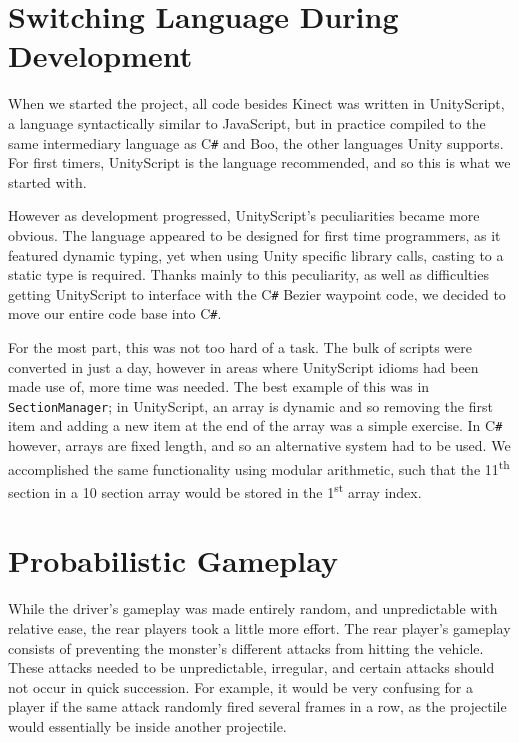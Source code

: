 \documentclass[a4paper,oneside]{memoir}
\begin{document}
		\section{Switching Language During Development}

			When we started the project, all code besides Kinect was written in UnityScript, a language syntactically similar to JavaScript, but in practice compiled to the same intermediary language as C\texttt{\#} and Boo, the other languages Unity supports. 
			For first timers, UnityScript is the language recommended, and so this is what we started with.

			However as development progressed, UnityScript's peculiarities became more obvious.
			The language appeared to be designed for first time programmers, as it featured dynamic typing, yet when using Unity specific library calls, casting to a static type is required.
			Thanks mainly to this peculiarity, as well as difficulties getting UnityScript to interface with the C\texttt{\#} Bezier waypoint code, we decided to move our entire code base into C\texttt{\#}.

			For the most part, this was not too hard of a task. 
			The bulk of scripts were converted in just a day, however in areas where UnityScript idioms had been made use of, more time was needed.
			The best example of this was in \texttt{SectionManager}; in UnityScript, an array is dynamic and so removing the first item and adding a new item at the end of the array was a simple exercise.
			In C\texttt{\#} however, arrays are fixed length, and so an alternative system had to be used.
			We accomplished the same functionality using modular arithmetic, such that the 11\textsuperscript{th} section in a 10 section array would be stored in the 1\textsuperscript{st} array index.

		\section{Probabilistic Gameplay}

			While the driver's gameplay was made entirely random, and unpredictable with relative ease, the rear players took a little more effort.
			The rear player's gameplay consists of preventing the monster's different attacks from hitting the vehicle.
			These attacks needed to be unpredictable, irregular, and certain attacks should not occur in quick succession.
			For example, it would be very confusing for a player if the same attack randomly fired several frames in a row, as the projectile would essentially be inside another projectile.
\end{document}
